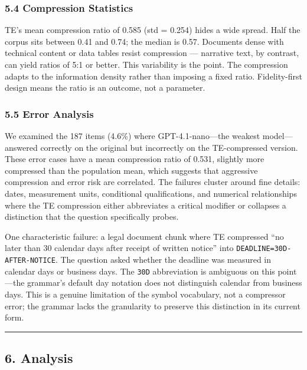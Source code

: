 \documentclass[
]{article}
\begin{document}
\subsubsection{5.4 Compression Statistics}\label{compression-statistics}

TE's mean compression ratio of 0.585 (std = 0.254) hides a wide spread.
Half the corpus sits between 0.41 and 0.74; the median is 0.57.
Documents dense with technical content or data tables resist compression
--- narrative text, by contrast, can yield ratios of 5:1 or better. This
variability is the point. The compression adapts to the information
density rather than imposing a fixed ratio. Fidelity-first design means
the ratio is an outcome, not a parameter.

\subsubsection{5.5 Error Analysis}\label{error-analysis}

We examined the 187 items (4.6\%) where GPT-4.1-nano---the weakest
model---answered correctly on the original but incorrectly on the
TE-compressed version. These error cases have a mean compression ratio
of 0.531, slightly more compressed than the population mean, which
suggests that aggressive compression and error risk are correlated. The
failures cluster around fine details: dates, measurement units,
conditional qualifications, and numerical relationships where the TE
compression either abbreviates a critical modifier or collapses a
distinction that the question specifically probes.

One characteristic failure: a legal document chunk where TE compressed
``no later than 30 calendar days after receipt of written notice'' into
\texttt{DEADLINE=30D-AFTER-NOTICE}. The question asked whether the
deadline was measured in calendar days or business days. The
\texttt{30D} abbreviation is ambiguous on this point---the grammar's
default day notation does not distinguish calendar from business days.
This is a genuine limitation of the symbol vocabulary, not a compressor
error; the grammar lacks the granularity to preserve this distinction in
its current form.

\begin{center}\rule{0.5\linewidth}{0.5pt}\end{center}

\subsection{6. Analysis}\label{analysis}
\end{document}
